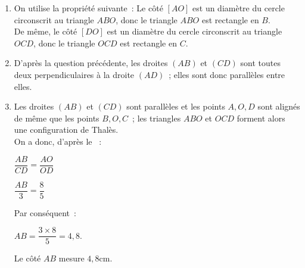 \begin{corrige}
     \begin{enumerate}
          \item %
          On utilise la propriété suivante~:
          Le côté $[AO]$ est un diamètre du cercle circonscrit au triangle $ABO$, donc le triangle $ABO$ est rectangle en $B$.\\
          De même, le côté $[DO]$ est un diamètre du cercle circonscrit au triangle $OCD$, donc le triangle $OCD$ est rectangle en $C$.
          \item %
          D'après la question précédente, les droites $(AB)$ et $(CD)$ sont toutes deux perpendiculaires à la droite $(AD)$~; elles sont donc parallèles entre elles.
          \item %
          Les droites $(AB)$ et $(CD)$ sont parallèles et les points $A, O, D$ sont alignés de même que les points $B, O, C$~; les triangles $ABO$ et $OCD$ forment alors une configuration de Thalès.\\
          On a donc, d'après le ~:
          \par
          $\dfrac{AB}{CD}=\dfrac{AO}{OD}$
          \par
          $\dfrac{AB}{3}=\dfrac{8}{5}$
          \par
          Par conséquent~:
          \par
          $AB=\dfrac{3 \times 8}{5}=4,8.$
          \par
          Le côté $AB$ mesure $4,8$cm.
     \end{enumerate}
\end{corrige}

